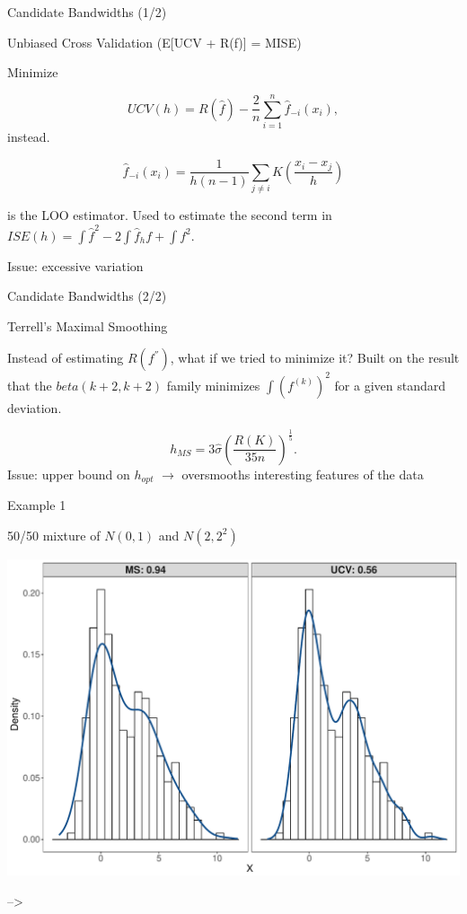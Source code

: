 \documentclass[ignorenonframetext,]{beamer}
\begin{document}
\begin{frame}{Candidate Bandwidths (1/2)}

\begin{block}{Unbiased Cross Validation (E{[}UCV + R(f){]} = MISE)}

Minimize

\[
UCV(h) = R\left(\widehat{f}\right) - \frac{2}{n} \sum_{i = 1}^{n} \widehat{f}_{-i}(x_i),
\] instead.

\[
\widehat{f}_{-i}(x_i) = \frac{1}{h(n-1)}\sum_{j \neq i} K\left(\frac{x_i - x_j}{h}\right)
\]

is the LOO estimator. Used to estimate the second term in
\(ISE(h) = \int \widehat{f}^2 - 2 \int\widehat{f}_h f + \int f^2\).

Issue: excessive variation

\end{block}

\end{frame}

\begin{frame}{Candidate Bandwidths (2/2)}

\begin{block}{Terrell's Maximal Smoothing}

Instead of estimating \(R(f^{''})\), what if we tried to minimize it?
Built on the result that the \(beta(k + 2, k + 2)\) family minimizes
\(\int (f^{(k)})^2\) for a given standard deviation.

\[
h_{MS} =  3 \hat \sigma \left(\frac{R(K)}{35 n} \right)^{\frac{1}{5}}.
\] Issue: upper bound on \(h_{opt}\) \(\rightarrow\) oversmooths
interesting features of the data

\end{block}

\end{frame}

\begin{frame}{Example 1}

50/50 mixture of \(N(0,1)\) and \(N(2, 2^2)\)

\includegraphics{ProjectPresentation_files/figure-beamer/unnamed-chunk-2-1.pdf}

--\textgreater{}

\end{frame}
\end{document}
